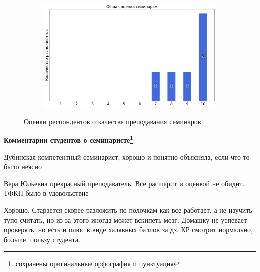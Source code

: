 \begin{figure}[H]
\begin{subfigure}[b]{0.45\textwidth}
			\end{subfigure}
			\begin{subfigure}[b]{0.45\textwidth}
				\centering
				\includegraphics[width=\textwidth]{images/3 course/ТФКП/seminarists-marks-Дубинская В.Ю.-3.png}
			\end{subfigure}	
			\caption{Оценки респондентов о качестве преподавания семинаров}
		\end{figure}

		\textbf{Комментарии студентов о семинаристе\protect\footnote{сохранены оригинальные орфография и пунктуация}}
            \begin{commentbox} 
                Дубинская компетентный семинарист, хорошо и понятно объясняла, если что-то было неясно 
            \end{commentbox} 
        
            \begin{commentbox} 
                Вера Юльевна прекрасный преподаватель. Все расшарит и оценкой не обидит. ТФКП было в удовольствие 
            \end{commentbox} 
        
            \begin{commentbox} 
                Хорошо. Старается скорее разложить по полочкам как все работает, а не научить тупо считать, но из-за этого иногда может вскипеть мозг. Домашку не успевает проверять, но есть и плюс в виде халявных баллов за дз. КР смотрит нормально, больше. пользу студента. 
            \end{commentbox} 


